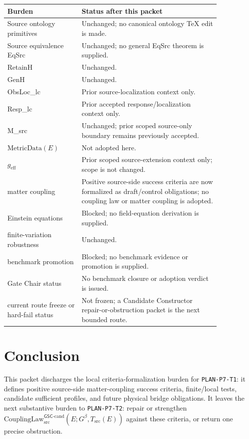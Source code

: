 \documentclass[11pt]{article}
\newcommand{\Gbeta}{G^\beta}
\newcommand{\geff}{g_{\mathrm{eff}}}
\newcommand{\CouplingLaw}{\mathrm{CouplingLaw}^{\mathsf{GSC}\mbox{-}\mathrm{cand}}_{\mathrm{src}}}
\newcommand{\MetricData}{\mathrm{MetricData}}
\begin{document}
\begin{longtable}{p{0.30\linewidth}p{0.56\linewidth}}
\toprule
Burden & Status after this packet \\
\midrule
Source ontology primitives & Unchanged; no canonical ontology TeX edit is made. \\
Source equivalence EqSrc & Unchanged; no general EqSrc theorem is supplied. \\
RetainH & Unchanged. \\
GenH & Unchanged. \\
ObsLoc\_lc & Prior source-localization context only. \\
Resp\_lc & Prior accepted response/localization context only. \\
M\_src & Unchanged; prior scoped source-only boundary remains previously accepted. \\
\(\MetricData(E)\) & Not adopted here. \\
\(\geff\) & Prior scoped source-extension context only; scope is not changed. \\
matter coupling & Positive source-side success criteria are now formalized as draft/control obligations; no coupling law or matter coupling is adopted. \\
Einstein equations & Blocked; no field-equation derivation is supplied. \\
finite-variation robustness & Unchanged. \\
benchmark promotion & Blocked; no benchmark evidence or promotion is supplied. \\
Gate Chair status & No benchmark closure or adoption verdict is issued. \\
current route freeze or hard-fail status & Not frozen; a Candidate Constructor repair-or-obstruction packet is the next bounded route. \\
\bottomrule
\end{longtable}

\section{Conclusion}

This packet discharges the local criteria-formalization burden for
\texttt{PLAN-P7-T1}: it defines positive source-side matter-coupling success
criteria, finite/local tests, candidate sufficient profiles, and future
physical bridge obligations. It leaves the next substantive burden to
\texttt{PLAN-P7-T2}: repair or strengthen
\(\CouplingLaw(E;\Gbeta,T_{\mathrm{src}}(E))\) against these criteria, or
return one precise obstruction.
\end{document}
